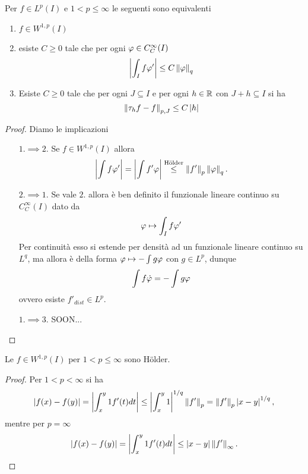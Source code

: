 \begin{proposition}\label{PrCaratterizzazioniSpazioDiSobolev}
Per $f\in L^p(I)$ e $1< p\leq\infty$ le seguenti sono equivalenti
\begin{enumerate}
    \item $f\in W^{1,p}(I)$
    \item esiste $C\geq 0$ tale che per ogni $\varphi\in C^\infty_C(I)$
    \[\left|{\int_I f\varphi'}\right|\leq C\left\Vert{\varphi}\right\Vert_{q}\]
    \item Esiste $C\geq 0$ tale che per ogni $J\subseteq I$ e per ogni $h\in \mathbb{R}$ con $J+h\subseteq I$ si ha
    \[\left\Vert{\tau_h f-f}\right\Vert_{p,J}\leq C\left|{h}\right|\]
\end{enumerate}
\end{proposition}
\begin{proof}
Diamo le implicazioni
\setlength{\leftmargini}{0cm}
\begin{itemize}
\item[$\boxed{1.\implies2.}$] Se $f\in W^{1,p}(I)$ allora
\[\left|{\int f\varphi'}\right|=\left|{\int f'\varphi}\right|\overset{\text{H\"older}}\leq \left\Vert{f'}\right\Vert_p\left\Vert{\varphi}\right\Vert_q.\]
\item[$\boxed{2.\implies1.}$] Se vale $2.$ allora \`e ben definito il funzionale lineare continuo su $C^\infty_C(I)$ dato da
\[\varphi\mapsto \int_I f\varphi'\]
Per continuit\`a esso si estende per densit\`a ad un funzionale lineare continuo su $L^q$, ma allora \`e della forma $\varphi\mapsto -\int g\varphi$ con $g\in L^p$, dunque
\[\int f\dot{\varphi}=-\int g\varphi\]
ovvero esiste $f'_{dist}\in L^p$.
\item[$\boxed{1.\implies3.}$] SOON...

\end{itemize}
\setlength{\leftmargini}{0.5cm}
\end{proof}


\begin{proposition}[]\label{PrElementiDiSpazioDiSobolevSonoHolderiani}
Le $f\in W^{1,p}(I)$ per $1<p\leq \infty$ sono H\"older. 
\end{proposition}
\begin{proof}
Per $1<p<\infty$ si ha
\[\left|{f(x)-f(y)}\right|=\left|{\int_x^y1f'(t)dt}\right|\leq \left|{\int_x^y1}\right|^{1/q}\left\Vert{f'}\right\Vert_p=\left\Vert{f'}\right\Vert_p\left|{x-y}\right|^{1/q},\]
mentre per $p=\infty$
\[\left|{f(x)-f(y)}\right|=\left|{\int_x^y1f'(t)dt}\right|\leq\left|{x-y}\right|\left\Vert{f'}\right\Vert_\infty.\]
\end{proof}













